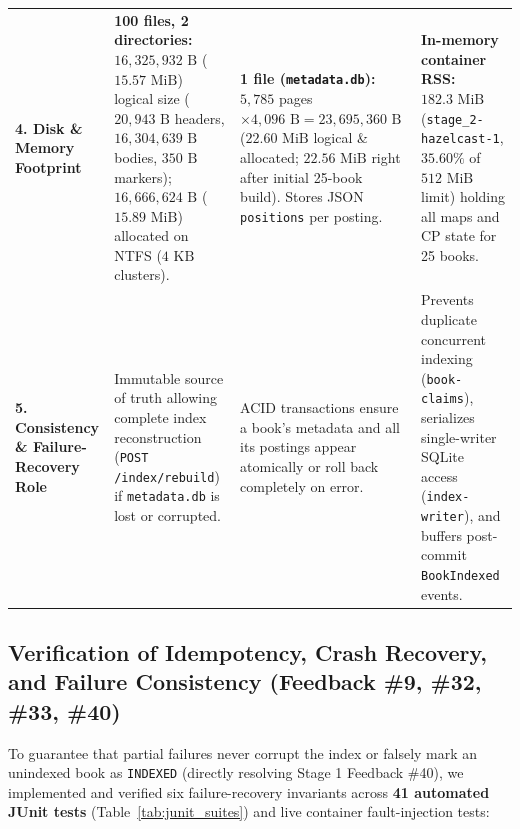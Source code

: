 \documentclass[10pt,a4paper]{article}
\begin{document}
\begin{table}[!htbp]
\begin{tabularx}{\textwidth}{L{2.7cm} Y Y Y}
\addlinespace[2pt]
\textbf{4. Disk \& Memory Footprint} & \textbf{100 files, 2 directories:} $16,325,932\text{ B}$ ($15.57\text{ MiB}$) logical size ($20,943\text{ B}$ headers, $16,304,639\text{ B}$ bodies, $350\text{ B}$ markers); $16,666,624\text{ B}$ ($15.89\text{ MiB}$) allocated on NTFS ($4\text{ KB}$ clusters). & \textbf{1 file (\texttt{metadata.db}):} $5,785$ pages $\times 4,096\text{ B} = 23,695,360\text{ B}$ ($22.60\text{ MiB}$ logical \& allocated; $22.56\text{ MiB}$ right after initial 25-book build). Stores JSON \texttt{positions} per posting. & \textbf{In-memory container RSS:} $182.3\text{ MiB}$ (\texttt{stage\_2-hazelcast-1}, $35.60\%$ of $512\text{ MiB}$ limit) holding all maps and CP state for 25 books. \\
\addlinespace[2pt]
\textbf{5. Consistency \& Failure-Recovery Role} & Immutable source of truth allowing complete index reconstruction (\texttt{POST /index/rebuild}) if \texttt{metadata.db} is lost or corrupted. & ACID transactions ensure a book's metadata and all its postings appear atomically or roll back completely on error. & Prevents duplicate concurrent indexing (\texttt{book-claims}), serializes single-writer SQLite access (\texttt{index-writer}), and buffers post-commit \texttt{BookIndexed} events. \\
\bottomrule
\end{tabularx}
\end{table}

\subsection{Verification of Idempotency, Crash Recovery, and Failure Consistency (Feedback \#9, \#32, \#33, \#40)}
\label{subsec:resilience_tests}
To guarantee that partial failures never corrupt the index or falsely mark an unindexed book as \texttt{INDEXED} (directly resolving Stage 1 Feedback \#40), we implemented and verified six failure-recovery invariants across \textbf{41 automated JUnit tests} (Table~\ref{tab:junit_suites}) and live container fault-injection tests:
\end{document}
